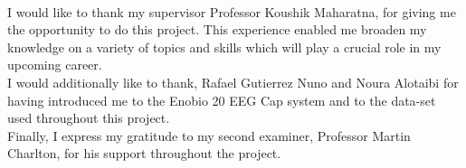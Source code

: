 

\begin{acknowledgements}
\\
I would like to thank my supervisor Professor Koushik Maharatna, for giving me the opportunity to do this project. This experience enabled me broaden my knowledge on a variety of topics and skills which will play a crucial role in my upcoming career. \\

I would additionally like to thank, Rafael Gutierrez Nuno and Noura Alotaibi for having introduced me to the Enobio 20 EEG Cap system and to the data-set used throughout this project. \\

Finally, I express my gratitude to my second examiner, Professor Martin Charlton, for his support throughout the project. 

\end{acknowledgements}
